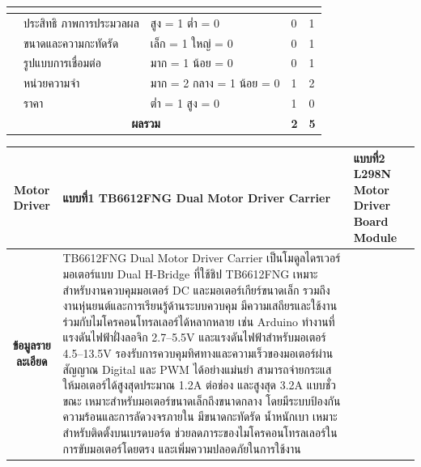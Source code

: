 \documentclass[14pt, fleqn, a4paper]{extarticle}
\begin{document}
\begin{enumerate}
\begin{enumerate}
\begin{table}[H]
\begin{tabular}{|p{1cm}|p{2cm}|p{1.75cm}|p{5cm}|p{5cm}|}
{			}
			\\ \hline

			\multirow{5}{*}{\rotatebox{90}{\parbox{3cm}{\centering\textbf{เกณฑ์การพิจารณา}}}}
			& ประสิทธิ
ภาพการประมวลผล
 & สูง = 1 ต่ำ = 0
			& 0 & 1 \\ \cline{2-5}

			& ขนาดและความกะทัดรัด & เล็ก = 1 ใหญ่ = 0
			& 0 & 1 \\ \cline{2-5}

			& รูปแบบการเชื่อมต่อ & มาก = 1 น้อย = 0
			& 0 & 1 \\ \cline{2-5}

			& หน่วยความจำ & มาก = 2 กลาง = 1 น้อย = 0
			& 1 & 2 \\ \cline{2-5}

			& ราคา & ต่ำ = 1 สูง = 0
			& 1 & 0 \\ \hline

			\multicolumn{3}{|c|}{\textbf{ผลรวม}} & \textbf{2} & \textbf{5} \\ \hline

			\end{tabular}
			\end{table}
			\begin{table}[H]
			\centering
			\renewcommand{\arraystretch}{1.35}

			\begin{tabular}{|p{1cm}|p{2cm}|p{1.75cm}|p{5cm}|p{5cm}|}
			\hline

			\multicolumn{3}{|c|}{\textbf{Motor Driver}} 
			& \textbf{แบบที่1 TB6612FNG Dual Motor Driver Carrier } 
			& \textbf{แบบที่2 L298N Motor Driver Board Module} 
			\\ \hline

			\multicolumn{3}{|c|}{\textbf{ข้อมูลรายละเอียด}} 
			& \multicolumn{1}{p{5cm}|}{
			TB6612FNG Dual Motor Driver Carrier เป็นโมดูลไดรเวอร์มอเตอร์แบบ Dual H-Bridge ที่ใช้ชิป TB6612FNG เหมาะสำหรับงานควบคุมมอเตอร์ DC และมอเตอร์เกียร์ขนาดเล็ก รวมถึงงานหุ่นยนต์และการเรียนรู้ด้านระบบควบคุม มีความเสถียรและใช้งานร่วมกับไมโครคอนโทรลเลอร์ได้หลากหลาย เช่น Arduino
ทำงานที่แรงดันไฟฟ้าฝั่งลอจิก 2.7–5.5V และแรงดันไฟฟ้าสำหรับมอเตอร์ 4.5–13.5V รองรับการควบคุมทิศทางและความเร็วของมอเตอร์ผ่านสัญญาณ Digital และ PWM ได้อย่างแม่นยำ
สามารถจ่ายกระแสให้มอเตอร์ได้สูงสุดประมาณ 1.2A ต่อช่อง และสูงสุด 3.2A แบบชั่วขณะ เหมาะสำหรับมอเตอร์ขนาดเล็กถึงขนาดกลาง โดยมีระบบป้องกันความร้อนและการลัดวงจรภายใน
มีขนาดกะทัดรัด น้ำหนักเบา เหมาะสำหรับติดตั้งบนเบรดบอร์ด ช่วยลดภาระของไมโครคอนโทรลเลอร์ในการขับมอเตอร์โดยตรง และเพิ่มความปลอดภัยในการใช้งาน

}
\end{tabular}
\end{table}
\end{enumerate}
\end{enumerate}
\end{document}
